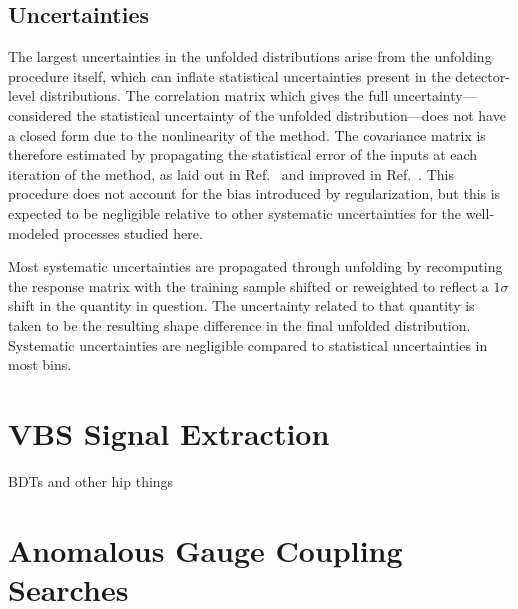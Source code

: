 \subsection{Uncertainties}

The largest uncertainties in the unfolded distributions arise from the unfolding procedure itself, which can inflate statistical uncertainties present in the detector-level distributions.
The correlation matrix which gives the full uncertainty---considered the statistical uncertainty of the unfolded distribution---does not have a closed form due to the nonlinearity of the method.
The covariance matrix is therefore estimated by propagating the statistical error of the inputs at each iteration of the method, as laid out in Ref.~\cite{DAgostini:1994fjx} and improved in Ref.~\cite{Adye:2011gm}.
This procedure does not account for the bias introduced by regularization, but this is expected to be negligible relative to other systematic uncertainties for the well-modeled processes studied here.

Most systematic uncertainties are propagated through unfolding by recomputing the response matrix with the training sample shifted or reweighted to reflect a $1\sigma$ shift in the quantity in question.
The uncertainty related to that quantity is taken to be the resulting shape difference in the final unfolded distribution.
Systematic uncertainties are negligible compared to statistical uncertainties in most bins.


\section{VBS Signal Extraction}
BDTs and other hip things



\section{Anomalous Gauge Coupling Searches}
